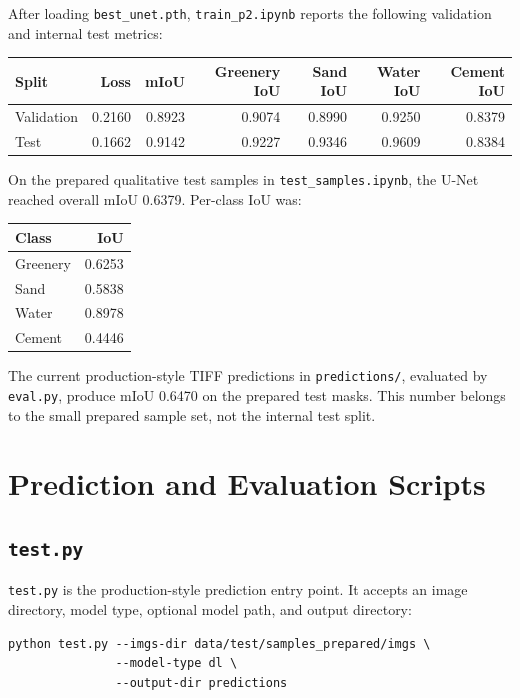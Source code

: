 \documentclass[11pt,a4paper]{article}
\begin{document}
After loading \texttt{best\_unet.pth}, \texttt{train\_p2.ipynb} reports the following validation and internal test metrics:
\begin{center}
\begin{tabular}{lrrrrrr}
\toprule
Split & Loss & mIoU & Greenery IoU & Sand IoU & Water IoU & Cement IoU \\
\midrule
Validation & 0.2160 & 0.8923 & 0.9074 & 0.8990 & 0.9250 & 0.8379 \\
Test & 0.1662 & 0.9142 & 0.9227 & 0.9346 & 0.9609 & 0.8384 \\
\bottomrule
\end{tabular}
\end{center}

On the prepared qualitative test samples in \texttt{test\_samples.ipynb}, the U-Net reached overall mIoU 0.6379. Per-class IoU was:
\begin{center}
\begin{tabular}{lr}
\toprule
Class & IoU \\
\midrule
Greenery & 0.6253 \\
Sand & 0.5838 \\
Water & 0.8978 \\
Cement & 0.4446 \\
\bottomrule
\end{tabular}
\end{center}

The current production-style TIFF predictions in \texttt{predictions/}, evaluated by \texttt{eval.py}, produce mIoU 0.6470 on the prepared test masks. This number belongs to the small prepared sample set, not the internal test split.

\section{Prediction and Evaluation Scripts}

\subsection{\texttt{test.py}}

\texttt{test.py} is the production-style prediction entry point. It accepts an image directory, model type, optional model path, and output directory:
\begin{verbatim}
python test.py --imgs-dir data/test/samples_prepared/imgs \
               --model-type dl \
               --output-dir predictions
\end{verbatim}
\end{document}
